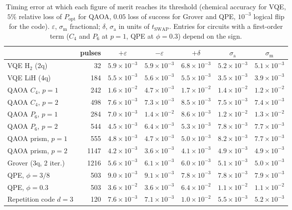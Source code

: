 \documentclass[reprint,aps,pra,amsmath,amssymb,superscriptaddress,letterpaper]{revtex4-2}
\newcommand{\tsw}{t_{\mathrm{SWAP}}}
\newcommand{\Popt}{P_{\mathrm{opt}}}
\begin{document}
\begin{table}[t]
\centering\small
\caption{Timing error at which each figure of merit reaches its threshold
(chemical accuracy for VQE, $5\%$ relative loss of $\Popt$ for QAOA, $0.05$
loss of success for Grover and QPE, $10^{-3}$ logical flip for the code).
$\varepsilon$, $\sigma_{\mathrm m}$ fractional; $\delta$, $\sigma_{\mathrm a}$
in units of $\tsw$. Entries for circuits with a first-order term ($C_4$ and
$P_6$ at $p=1$, QPE at $\phi=0.3$) depend on the sign.}
\label{tab:thr}
\begin{tabular}{lrccccc}
\toprule
 & pulses & $+\varepsilon$ & $-\varepsilon$ & $+\delta$ & $\sigma_{\mathrm a}$ & $\sigma_{\mathrm m}$\\
\midrule
VQE H$_2$ (2q) & 32 & $5.9\times10^{-3}$ & $5.9\times10^{-3}$ & $6.8\times10^{-3}$ & $5.2\times10^{-3}$ & $5.1\times10^{-3}$ \\
VQE LiH (4q) & 184 & $5.5\times10^{-3}$ & $5.6\times10^{-3}$ & $5.5\times10^{-3}$ & $3.5\times10^{-3}$ & $3.9\times10^{-3}$ \\
QAOA $C_4$, $p=1$ & 242 & $1.6\times10^{-2}$ & $4.7\times10^{-3}$ & $1.7\times10^{-2}$ & $1.4\times10^{-2}$ & $1.2\times10^{-2}$ \\
QAOA $C_4$, $p=2$ & 498 & $7.6\times10^{-3}$ & $7.3\times10^{-3}$ & $8.5\times10^{-3}$ & $7.5\times10^{-3}$ & $7.4\times10^{-3}$ \\
QAOA $P_6$, $p=1$ & 284 & $7.0\times10^{-3}$ & $1.4\times10^{-2}$ & $8.6\times10^{-3}$ & $1.2\times10^{-2}$ & $1.3\times10^{-2}$ \\
QAOA $P_6$, $p=2$ & 544 & $4.5\times10^{-3}$ & $6.4\times10^{-3}$ & $5.3\times10^{-3}$ & $7.8\times10^{-3}$ & $7.7\times10^{-3}$ \\
QAOA prism, $p=1$ & 555 & $4.8\times10^{-3}$ & $4.7\times10^{-3}$ & $5.0\times10^{-3}$ & $8.2\times10^{-3}$ & $7.7\times10^{-3}$ \\
QAOA prism, $p=2$ & 1147 & $4.2\times10^{-3}$ & $3.6\times10^{-3}$ & $4.1\times10^{-3}$ & $4.9\times10^{-3}$ & $4.9\times10^{-3}$ \\
Grover (3q, 2 iter.) & 1216 & $5.6\times10^{-3}$ & $6.1\times10^{-3}$ & $6.0\times10^{-3}$ & $5.1\times10^{-3}$ & $5.0\times10^{-3}$ \\
QPE, $\phi=3/8$ & 503 & $9.0\times10^{-3}$ & $9.1\times10^{-3}$ & $7.8\times10^{-3}$ & $7.8\times10^{-3}$ & $7.9\times10^{-3}$ \\
QPE, $\phi=0.3$ & 503 & $3.6\times10^{-2}$ & $3.6\times10^{-3}$ & $6.4\times10^{-2}$ & $1.1\times10^{-2}$ & $1.1\times10^{-2}$ \\
Repetition code $d=3$ & 120 & $7.6\times10^{-3}$ & $7.1\times10^{-3}$ & $1.0\times10^{-2}$ & $5.5\times10^{-3}$ & $5.2\times10^{-3}$ \\
\bottomrule
\end{tabular}
\end{table}
\end{document}
